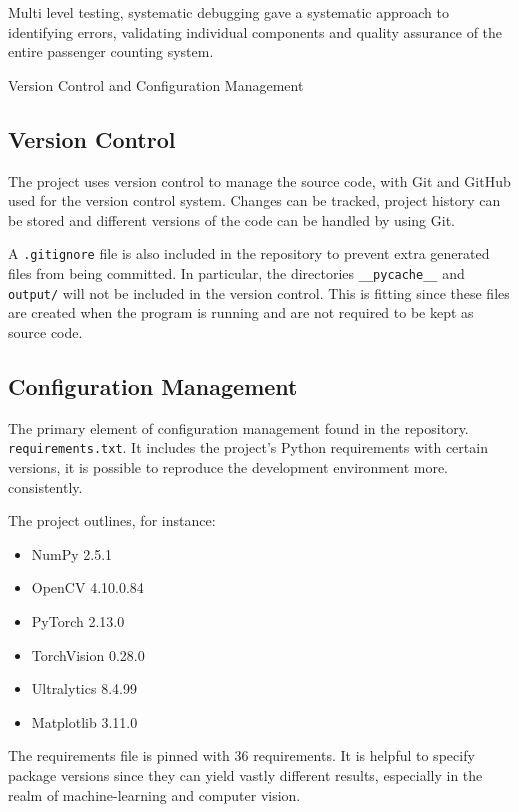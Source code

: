 Multi level testing, systematic debugging gave a systematic approach to identifying errors, validating individual components and quality assurance of the entire passenger counting system.

Version Control and Configuration Management

\subsection{Version Control}

The project uses version control to manage the source code, with Git and GitHub used for the version control system. Changes can be tracked, project history can be stored and different versions of the code can be handled by using Git.

A \texttt{.gitignore} file is also included in the repository to prevent extra generated files from being committed. In particular, the directories \texttt{\_\_\allowbreak pycache\_\_} and \texttt{output/} will not be included in the version control. This is fitting since these files are created when the program is running and are not required to be kept as source code.

\subsection{Configuration Management}

The primary element of configuration management found in the repository.
\texttt{requirements\allowbreak.txt}. It includes the project's Python requirements
with certain versions, it is possible to reproduce the development environment more.
consistently.

The project outlines, for instance:

\begin{itemize}
    \item NumPy 2.5.1
    \item OpenCV 4.10.0.84
    \item PyTorch 2.13.0
    \item TorchVision 0.28.0
    \item Ultralytics 8.4.99
    \item Matplotlib 3.11.0
\end{itemize}

The requirements file is pinned with 36 requirements. It is helpful to specify package versions since they can yield vastly different results, especially in the realm of machine-learning and computer vision.
